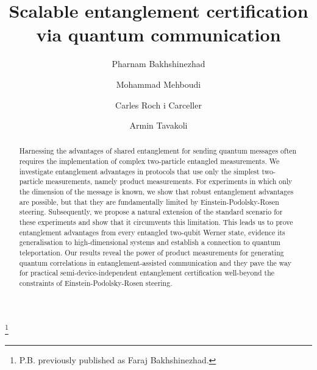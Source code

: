 \documentclass[aps,superscriptaddress,twocolumn,twoside,floatfix,pra,nofootinbib,a4paper]{revtex4-2}
\begin{document}

\title{Scalable entanglement certification via quantum communication}

\author{Pharnam Bakhshinezhad}
\thanks{P.B. previously published as Faraj Bakhshinezhad.}


\author{Mohammad Mehboudi}




\author{Carles Roch i Carceller}


\author{Armin Tavakoli}


\begin{abstract}
Harnessing the advantages of shared entanglement for sending quantum messages often requires the implementation of complex two-particle entangled measurements.  We investigate entanglement advantages in protocols that use only the simplest two-particle measurements, namely product measurements. For experiments in which only the dimension of the message is known, we show that robust entanglement advantages are possible, but that they are fundamentally limited by Einstein-Podolsky-Rosen steering. Subsequently, we propose a natural extension of the standard scenario for these experiments and show that it circumvents this limitation. This leads us to prove entanglement advantages from every entangled two-qubit Werner state, evidence its generalisation to high-dimensional systems and establish a connection to quantum teleportation. Our results reveal the  power of product measurements for generating quantum correlations in entanglement-assisted communication and they pave the way for practical semi-device-independent entanglement certification well-beyond the constraints of Einstein-Podolsky-Rosen steering.
\end{abstract}

\maketitle
\end{document}
